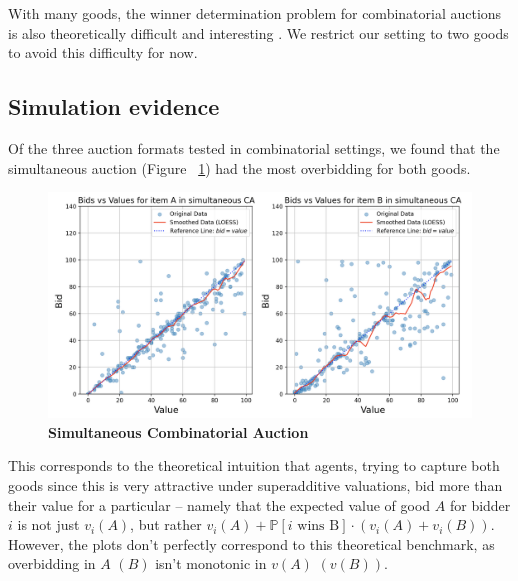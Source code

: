 \documentclass{article} %
\begin{document}
With many goods, the winner determination problem for combinatorial auctions is also theoretically difficult and interesting \cite{lehmann2006winner}. We restrict our setting to two goods to avoid this difficulty for now.

\subsection{Simulation evidence}
Of the three auction formats tested in combinatorial settings, we found that the simultaneous auction (Figure ~\ref{fig:simu}) had the most overbidding for both goods. 

\begin{figure}[h!]
    \centering \includegraphics[width=\linewidth]{Figs/Simultaneous.png}
    \caption{\textbf{Simultaneous Combinatorial Auction} }
    \label{fig:simu}
\end{figure}

This corresponds to the theoretical intuition that agents, trying to capture both goods since this is very attractive under superadditive valuations, bid more than their value for a particular -- namely that the expected value of good $A$ for bidder $i$ is not just $v_i(A)$, but rather $v_i(A) + \mathbb{P}[\text{$i$ wins B}]\cdot(v_i(A) + v_i(B))$. However, the plots don't perfectly correspond to this theoretical benchmark, as overbidding in $A$ $(B)$ isn't monotonic in $v(A)$ $(v(B))$.
\end{document}
